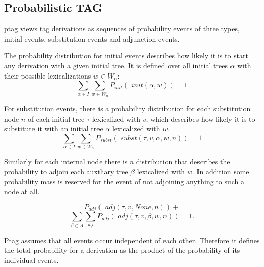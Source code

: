 \subsection{Probabilistic TAG}
\label{ssec:probmodels}
{\sc ptag} \cite{resnik1992} views {\sc tag} derivations as sequences of probability events of three types, initial events, substitution events and adjunction events.

\newcommand{\adj}[0]{\textit{ adj}}
\newcommand{\init}[0]{\textit{ init}}
\newcommand{\subst}[0]{\textit{ subst}}
The probability distribution for initial events describes how likely it is to start any derivation with a given initial tree. 
It is defined over all initial trees $\alpha$ with their possible lexicalizations $w \in W_\alpha$: 
$$ \sum\limits_{\alpha \in I}\sum\limits_{w \in W_\alpha} P_{init}(\init(\alpha, w)) = 1 $$

For substitution events, there is a probability distribution for each substitution node $n$ of each initial tree $\tau$ lexicalized with $v$, which describes how likely it is to substitute it with an initial tree $\alpha$ lexicalized with $w$. 
$$\sum\limits_{\alpha \in I}\sum\limits_{w \in W_\alpha} P_{subst}(\subst(\tau,v , \alpha, w, n)) = 1$$

Similarly for each internal node there is a distribution that describes the probability to adjoin each auxiliary tree $\beta$ lexicalized with $w$. In addition some probability mass is reserved for the event of not adjoining anything to such a node at all.

$$ P_{adj}(\adj(\tau, v, \textit{None}, n)) +$$
$$ \sum\limits_{\beta \in A}\sum\limits_{w_\beta} P_{adj}(\adj(\tau, v, \beta, w, n)) = 1.$$

{\sc Ptag} assumes that all events occur independent of each other. Therefore it defines the total probability for a derivation as the product of the probability of its individual events. 

